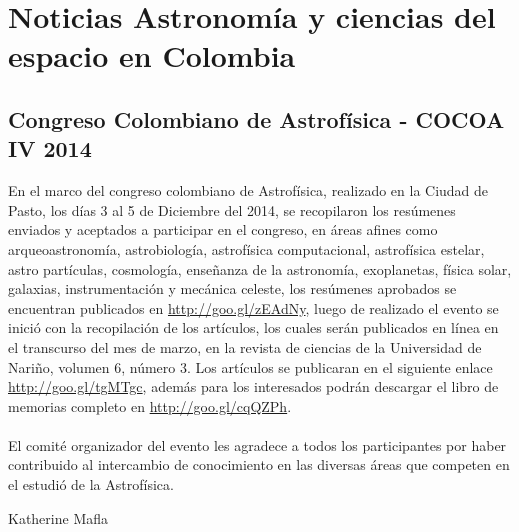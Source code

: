 \documentclass{book}
\begin{document}
\tableofcontents{}




\renewcommand\thesection{\arabic{section}}
\renewcommand\thesubsection{\arabic{subsection}}

\section*{Noticias Astronomía y ciencias del espacio en Colombia}

\subsection{Congreso Colombiano de Astrofísica - COCOA IV 2014}

En el marco del congreso colombiano de Astrofísica, realizado en la Ciudad de Pasto, los  días 3 al 5 de Diciembre del 2014, se recopilaron los  resúmenes enviados y aceptados a participar en el congreso, en áreas afines como  arqueoastronomía, astrobiología, astrofísica computacional, astrofísica estelar, astro partículas, cosmología, enseñanza de la astronomía, exoplanetas, física solar, galaxias, instrumentación y mecánica celeste, los resúmenes aprobados se encuentran publicados en  \url{http://goo.gl/zEAdNy}, luego de realizado el evento se inició con la recopilación de los artículos, los cuales serán publicados en línea en el transcurso del mes de marzo, en la revista de ciencias de la Universidad de Nariño, volumen 6, número 3. Los artículos se publicaran en el siguiente enlace \url{http://goo.gl/tgMTgc}, además para los interesados podrán descargar el libro de memorias completo en \url{http://goo.gl/cqQZPh}.\\
\\
El comité organizador del evento les agradece a todos los participantes por haber contribuido al intercambio de conocimiento en las diversas áreas que competen en el estudió de la Astrofísica.

\begin{flushright}
Katherine Mafla
\end{flushright}
\newpage
\end{document}
